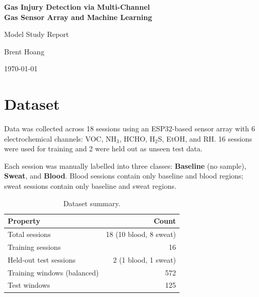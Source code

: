 \documentclass[11pt, a4paper]{article}
\begin{document}
\begin{titlepage}
    \centering
    \vspace*{2cm}
    {\LARGE\bfseries Gas Injury Detection via Multi-Channel\\[0.4em]
    Gas Sensor Array and Machine Learning\par}
    \vspace{1.5cm}
    {\large Model Study Report\par}
    \vspace{1cm}
    {\normalsize Brent Hoang\par}
    \vspace{0.5cm}
    {\normalsize \today\par}
    \vfill
\end{titlepage}

\section{Dataset}

Data was collected across 18 sessions using an ESP32-based sensor array with
6 electrochemical channels: VOC, NH$_3$, HCHO, H$_2$S, EtOH, and RH.
16 sessions were used for training and 2 were held out as unseen test data.

Each session was manually labelled into three classes:
\textbf{Baseline} (no sample), \textbf{Sweat}, and \textbf{Blood}.
Blood sessions contain only baseline and blood regions; sweat sessions contain
only baseline and sweat regions.

\begin{table}[H]
\centering
\caption{Dataset summary.}
\begin{tabular}{lr}
\toprule
\textbf{Property} & \textbf{Count} \\
\midrule
Total sessions              & 18 (10 blood, 8 sweat) \\
Training sessions           & 16 \\
Held-out test sessions      & 2 (1 blood, 1 sweat) \\
Training windows (balanced) & 572 \\
Test windows                & 125 \\
\bottomrule
\end{tabular}
\end{table}

\end{document}
